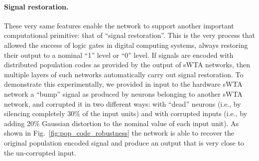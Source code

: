 \paragraph{Signal restoration.}
These very same features enable the network to support another important computational primitive: that of ``signal restoration''.
This is the very process that allowed the success of logic gates in digital computing systems, always restoring their output to a nominal ``1'' level or ``0'' level.
If signals are encoded with distributed population codes as provided by the output of \ac{sWTA} networks, then multiple layers of such networks automatically carry out signal restoration. To demonstrate this experimentally, we provided in input to the hardware \ac{sWTA} network a  ``bump'' signal as produced by neurons belonging to another \ac{sWTA} network, and corrupted it in two different ways: with ``dead'' neurons (i.e., by silencing completely 30\% of the input units) and with corrupted inputs (i.e., by adding 20\% Gaussian distortion to the nominal value of each input unit). As shown in Fig.~\ref{fig:pop_code_robustness} the network is able to recover the original population encoded signal and produce an output that is very close to the un-corrupted input. 

